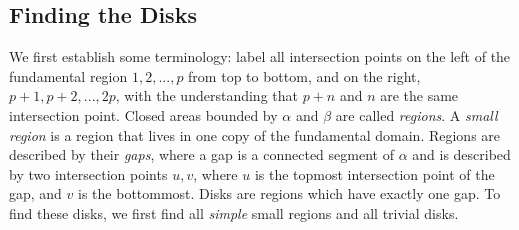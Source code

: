\documentclass[reqno, 12pt]{amsart}
\theoremstyle{remark}
\begin{document}
\subsection{Finding the Disks}
We first establish some terminology: label all intersection points on the left of the fundamental region $1,2,...,p$ from top to bottom, and on the right, $p+1,p+2,...,2p$, with the understanding that $p+n$ and $n$ are the same intersection point. Closed areas bounded by $\alpha$ and $\beta$  are called \textit{regions}. A \textit{small region} is a region that lives in one copy of the fundamental domain. Regions are described by their \textit{gaps}, where a gap is a connected segment of $\alpha$ and is described by two intersection points $u, v$, where $u$ is the topmost intersection point of the gap, and $v$ is the bottommost. Disks are regions which have exactly one gap. To find these disks, we first find all \textit{simple} small regions and all trivial disks. 
\end{document}
